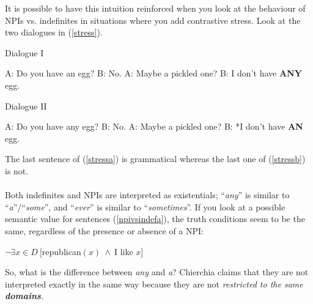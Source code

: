 \documentclass[a4paper,11pt]{article}
\newcommand{\reff}[1]{(\ref{#1})}
\newcommand{\exs}[2][]{\begin{exe}\ex #1 \begin{xlist}#2\end{xlist}\end{exe}}
\begin{document}
It is possible to have this intuition reinforced when you look at the behaviour of NPIs vs. indefinites in situations where you add contrastive stress. Look at the two dialogues in \reff{stress}.

\exs[\label{stress}]{
  \ex\label{stressa} Dialogue I
    \begin{xlist}
      \ex A: Do you have an egg?
      \ex B: No.
      \ex A: Maybe a pickled one?
      \ex B: I don't have \textbf{ANY} egg.
    \end{xlist}
  \ex\label{stressb} Dialogue II
    \begin{xlist}
      \ex A: Do you have any egg?
      \ex B: No.
      \ex A: Maybe a pickled one?
      \ex B: *I don't have \textbf{AN} egg.
    \end{xlist}
}
%
The last sentence of \reff{stressa} is grammatical whereas the last one of \reff{stressb} is not.

\paragraph{}
Both indefinites and NPIs are interpreted as existentials; \enquote{\emph{any}} is similar to \enquote{\emph{a}}/\enquote{\emph{some}}, and \enquote{\emph{ever}} is similar to \enquote{\emph{sometimes}}. If you look at a possible semantic value for sentences \reff{npivsindefa}, the truth conditions seem to be the same, regardless of the presence or absence of a NPI:

\begin{exe}
   $\neg \exists{x \in D}~[$republican$(x)~\wedge~$I like $x$]
\end{exe}

So, what is the difference between \emph{any} and \emph{a}? Chierchia claims that they are not interpreted exactly in the same way because they are not \emph{restricted to the same \textbf{domains}}.
\end{document}
